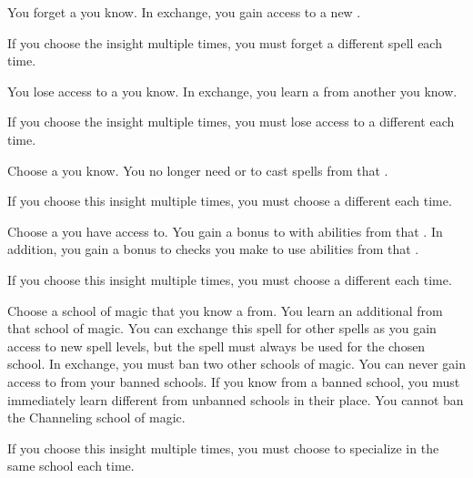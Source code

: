         {
             You forget a  you know.
            In exchange, you gain access to a new .
            \par If you choose the insight multiple times, you must forget a different spell each time.

             You lose access to a  you know.
            In exchange, you learn a  from another  you know.
            \par If you choose the insight multiple times, you must lose access to a different  each time.

             Choose a  you know.
            You no longer need  or  to cast spells from that .
            \par If you choose this insight multiple times, you must choose a different  each time.

             Choose a  you have access to.
            You gain a  bonus to  with abilities from that .
            In addition, you gain a  bonus to  checks you make to use abilities from that .
            \par If you choose this insight multiple times, you must choose a different  each time.

             Choose a school of magic that you know a  from.
            You learn an additional  from that school of magic.
            You can exchange this spell for other spells as you gain access to new spell levels, but the spell must always be used for the chosen school.
            In exchange, you must ban two other schools of magic.
            You can never gain access to  from your banned schools.
            If you know  from a banned school, you must immediately learn different  from unbanned schools in their place.
            You cannot ban the Channeling school of magic.
            \par If you choose this insight multiple times, you must choose to specialize in the same school each time.

}
